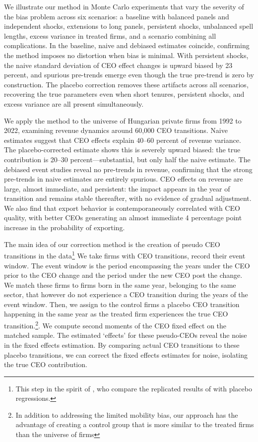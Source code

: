 \documentclass[11pt,a4paper]{article}
\begin{document}
We illustrate our method in Monte Carlo experiments that vary the severity of the bias problem across six scenarios: a baseline with balanced panels and independent shocks, extensions to long panels, persistent shocks, unbalanced spell lengths, excess variance in treated firms, and a scenario combining all complications. In the baseline, naive and debiased estimates coincide, confirming the method imposes no distortion when bias is minimal. With persistent shocks, the naive standard deviation of CEO effect changes is upward biased by 23 percent, and spurious pre-trends emerge even though the true pre-trend is zero by construction. The placebo correction removes these artifacts across all scenarios, recovering the true parameters even when short tenures, persistent shocks, and excess variance are all present simultaneously.

We apply the method to the universe of Hungarian private firms from 1992 to 2022, examining revenue dynamics around 60,000 CEO transitions. Naive estimates suggest that CEO effects explain 40--60 percent of revenue variance. The placebo-corrected estimate shows this is severely upward biased: the true contribution is 20--30 percent—substantial, but only half the naive estimate. The debiased event studies reveal no pre-trends in revenue, confirming that the strong pre-trends in naive estimates are entirely spurious. CEO effects on revenue are large, almost immediate, and persistent: the impact appears in the year of transition and remains stable thereafter, with no evidence of gradual adjustment. We also find that export behavior is contemporaneously correlated with CEO quality, with better CEOs generating an almost immediate 4 percentage point increase in the probability of exporting.


The main idea of our correction method is the creation of pseudo CEO transitions in the data\footnote{This step in the spirit of \cite{jarosiewicz2023revisiting}, who compare the replicated results of  \cite{Bertrand2003-io} with placebo regressions.} We take firms with CEO transitions, record their event window. The event window is the period encompassing the years under the CEO prior to the CEO change and the period under the new CEO post the change. We match these firms to firms born in the same year, belonging to the same sector, that however do not experience a CEO transition during the years of the event window. Then, we assign to the control firms a placebo CEO transition happening in the same year as the treated firm experiences the true CEO transition.\footnote{In addition to addressing the limited mobility bias, our approach has the advantage of creating a control group that is more similar to the treated firms than the universe of firms}. We compute second moments of the CEO fixed effect on the matched sample. The estimated `effects' for these pseudo-CEOs reveal the noise in the fixed effects estimation. By comparing actual CEO transitions to these placebo transitions, we can correct the fixed effects estimates for noise, isolating the true CEO contribution.
\end{document}

